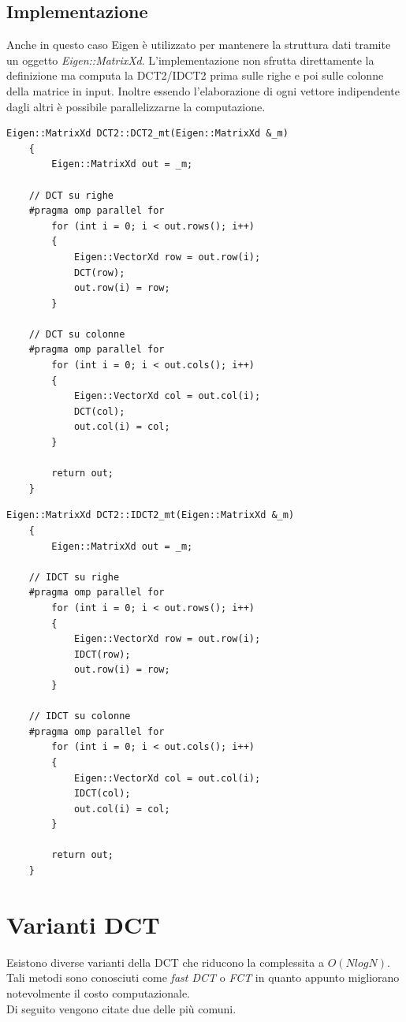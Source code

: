 \documentclass[a4paper,12pt]{report}
\begin{document}
\subsection*{Implementazione}
Anche in questo caso Eigen è utilizzato per mantenere la struttura dati tramite un oggetto \textit{Eigen::MatrixXd}. L'implementazione non sfrutta direttamente la definizione ma computa la DCT2/IDCT2 prima sulle righe e poi sulle colonne della matrice in input. Inoltre essendo l'elaborazione di ogni vettore indipendente dagli altri è possibile parallelizzarne la computazione.\\
\begin{lstlisting}[caption={Funzione di calcolo DCT2},captionpos=b]
	Eigen::MatrixXd DCT2::DCT2_mt(Eigen::MatrixXd &_m)
	{
		Eigen::MatrixXd out = _m;
	
	// DCT su righe
	#pragma omp parallel for
		for (int i = 0; i < out.rows(); i++)
		{
			Eigen::VectorXd row = out.row(i);
			DCT(row);
			out.row(i) = row;
		}
	
	// DCT su colonne
	#pragma omp parallel for
		for (int i = 0; i < out.cols(); i++)
		{
			Eigen::VectorXd col = out.col(i);
			DCT(col);
			out.col(i) = col;
		}
	
		return out;
	}
\end{lstlisting}
\newpage
\begin{lstlisting}[caption={Funzione di calcolo IDCT2},captionpos=b]
	Eigen::MatrixXd DCT2::IDCT2_mt(Eigen::MatrixXd &_m)
	{
		Eigen::MatrixXd out = _m;
	
	// IDCT su righe
	#pragma omp parallel for
		for (int i = 0; i < out.rows(); i++)
		{
			Eigen::VectorXd row = out.row(i);
			IDCT(row);
			out.row(i) = row;
		}
	
	// IDCT su colonne
	#pragma omp parallel for
		for (int i = 0; i < out.cols(); i++)
		{
			Eigen::VectorXd col = out.col(i);
			IDCT(col);
			out.col(i) = col;
		}
	
		return out;
	}
\end{lstlisting}

\section{Varianti DCT}
Esistono diverse varianti della DCT che riducono la complessita a \(O(NlogN)\). Tali metodi sono conosciuti come \textit{fast DCT} o \textit{FCT} in quanto appunto migliorano notevolmente il costo computazionale.\\Di seguito vengono citate due delle più comuni.
\end{document}
